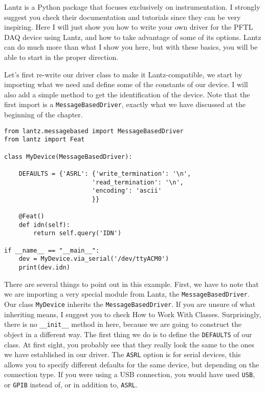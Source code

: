 Lantz is a Python package that focuses exclusively on instrumentation. I
strongly suggest you check their documentation and tutorials since they
can be very inspiring. Here I will just show you how to write your own
driver for the {PFTL} {DAQ} device using Lantz, and how to take
advantage of some of its options. Lantz can do much more than what I
show you here, but with these basics, you will be able to start in the
proper direction.

Let's first re-write our driver class to make it Lantz-compatible, we
start by importing what we need and define some of the constants of our
device. I will also add a simple method to get the identification of the
device. Note that the first import is a \texttt{MessageBasedDriver},
exactly what we have discussed at the beginning of the chapter.

\begin{verbatim}
from lantz.messagebased import MessageBasedDriver
from lantz import Feat

class MyDevice(MessageBasedDriver):

    DEFAULTS = {'ASRL': {'write_termination': '\n',
                        'read_termination': '\n',
                        'encoding': 'ascii'
                        }}

    @Feat()
    def idn(self):
        return self.query('IDN')

if __name__ == "__main__":
    dev = MyDevice.via_serial('/dev/ttyACM0')
    print(dev.idn)
\end{verbatim}

There are several things to point out in this example. First, we have to
note that we are importing a very special module from Lantz, the
\texttt{MessageBasedDriver}. Our class \texttt{MyDevice} inherits the
\texttt{MessageBasedDriver}. If you are unsure of what inheriting means,
I suggest you to check How to Work With Classes. Surprisingly, there is
no \texttt{\_\_init\_\_} method in here, because we are going to
construct the object in a different way. The first thing we do is to
define the \texttt{DEFAULTS} of our class. At first sight, you probably
see that they really look the same to the ones we have established in
our driver. The \texttt{ASRL} option is for serial devices, this allows
you to specify different defaults for the same device, but depending on
the connection type. If you were using a {USB} connection, you would
have used \texttt{USB}, or \texttt{GPIB} instead of, or in
addition to, \texttt{ASRL}.

